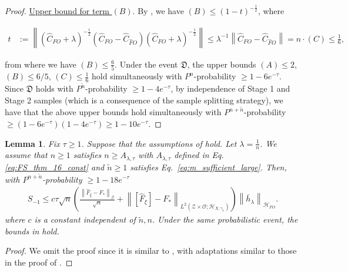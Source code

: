 \documentclass[11pt]{article}
\newcommand{\stageonesamples}{\tilde{n}}
\newcommand{\calZ}{\mathcal{Z}}
\newcommand{\calG}{\mathcal{G}}
\newcommand{\calO}{\mathcal{O}}
\newcommand{\0}{\mathbf{0}}
\newtheorem{lem}{Lemma}[section]
\begin{document}
\begin{appendix}
\begin{proof}
\underline{Upper bound for term $(B)$}. By \citet[Proposition 7]{rudi2015less}, we have $
(B)\leq (1-t)^{-\frac{1}{2}}$, where
\begin{small}
\begin{align*}
    t&:=\left\|\left(\hat{C}_{FO} + \lambda\right)^{-\frac{1}{2}}\left(\hat{C}_{FO} - \hat{C}_{\hat{F}O}\right)\left(\hat{C}_{FO} + \lambda \right)^{-\frac{1}{2}}\right\| \leq \lambda^{-1}\left\|\hat{C}_{FO} - \hat{C}_{\hat{F}O}\right\| = n \cdot (C) \leq \frac{1}{6}, 
\end{align*}
\end{small}
from where we have $(B)\leq \frac{6}{5}$. Under the event $\mathfrak{D}$, the upper bounds $(A)\leq 2$, $(B)\leq 6/5$, $(C)\leq \frac{1}{6}$ hold simultaneously with $P^{n}$-probability $\geq 1 - 6e^{-\tau}$. Since $\mathfrak{D}$ holds with $P^{\tilde{n}}$-probability $\geq 1 - 4e^{-\tau}$, by independence of Stage 1 and Stage 2 samples (which is a consequence of the sample splitting strategy), we have that the above upper bounds hold simultaneously with $P^{n+\stageonesamples}$-probability $\geq \left(1 - 6e^{-\tau}\right)\left(1 - 4e^{-\tau}\right) \geq 1 - 10e^{-\tau}$.
\end{proof}

\begin{lem}\label{lem:thm11_meunier}
Fix $\tau\geq 1$. Suppose that the assumptions of  hold. Let $\lambda = \frac{1}{n}$. We assume that $n\geq 1$ satisfies $n\geq A_{\lambda,\tau}$ with $A_{\lambda,\tau}$ defined in Eq. \eqref{eq:FS_thm_16_const} and $\stageonesamples \geq 1$ satisfies Eq.~\eqref{eq:m_sufficient_large}. Then, with $P^{n+\stageonesamples}$-probability $\geq 1-18e^{-\tau}$
    \begin{align*}
        S_{-1} \leq c \tau\sqrt{n}\left(\frac{\left\|\hat{F}_{\xi} -F_\ast \right\|_{\calG}}{\sqrt{n}}+\left\| \left[\hat{F}_{\xi}\right] - F_\ast \right\|_{L^2\left(\calZ\times\calO; \mathcal{H}_{X,\gamma_x}\right)}\right)\left\|\bar{h}_\lambda\right\|_{\mathcal{H}_{FO}} .
    \end{align*}
    where $c$ is a constant independent of $\stageonesamples, n$. Under the same probabilistic event, the bounds in  hold. 
\end{lem}
\begin{proof}
    We omit the proof since it is similar to \citet[Theorem 11]{meunier2024nonparametricinstrumentalregressionkernel}, with adaptations similar to those in the proof of . 
\end{proof}






\end{appendix}
\end{document}
